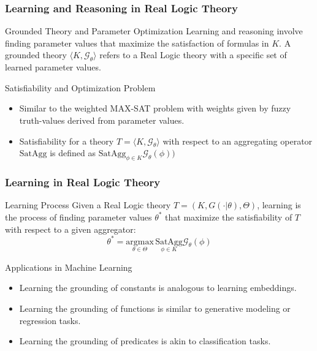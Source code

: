 \documentclass{beamer}
\newcommand{\G}{\mathcal{G}}
\begin{document}
\begin{frame}
\frametitle{Learning and Reasoning in Real Logic Theory}
\begin{block}{Grounded Theory and Parameter Optimization}
Learning and reasoning involve finding parameter values that maximize
the satisfaction of formulas in \( K \). A grounded theory \( \langle
K, \G_\theta \rangle \) refers to a Real Logic theory with a specific
set of learned parameter values.
\end{block}

\begin{block}{Satisfiability and Optimization Problem}
\begin{itemize}
    \item Similar to the weighted MAX-SAT problem with weights given by fuzzy truth-values derived from parameter values.
    \item Satisfiability for a theory \( T = \langle K, \G_\theta
      \rangle \) with respect to an aggregating operator \(
      \text{SatAgg} \) is defined as \( \text{SatAgg}_{\phi \in K}
      \G_\theta(\phi)) \)
\end{itemize}
\end{block}
\end{frame}

\begin{frame}
\frametitle{Learning in Real Logic Theory}
\begin{block}{Learning Process}
Given a Real Logic theory \( T = (K, G(\cdot | \theta), \Theta) \), learning is the process of finding parameter values \( \theta^* \) that maximize the satisfiability of \( T \) with respect to a given aggregator:
\[ \theta^* = \underset{\theta \in \Theta}{\text{argmax}} \, \underset{\phi \in K}{\text{SatAgg}}\G_\theta(\phi) \]
\end{block}

\begin{block}{Applications in Machine Learning}
\begin{itemize}
    \item Learning the grounding of constants is analogous to learning embeddings.
    \item Learning the grounding of functions is similar to generative modeling or regression tasks.
    \item Learning the grounding of predicates is akin to classification tasks.
\end{itemize}
\end{block}
\end{frame}
\end{document}
